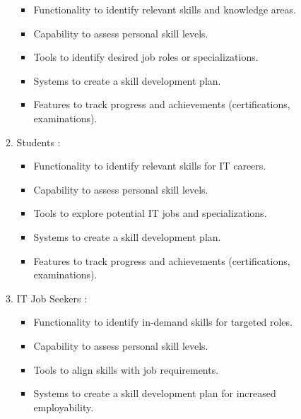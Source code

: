 \begin{enumerate}
\begin{enumerate}
\begin{itemize}
                        \renewcommand\labelitemi{-}
                        \item Functionality to identify relevant skills and knowledge areas.
                        \item Capability to assess personal skill levels.
                        \item Tools to identify desired job roles or specializations.
                        \item Systems to create a skill development plan.
                        \item Features to track progress and achievements (certifications, examinations).
                    \end{itemize}
              \item Students : \\
                    \begin{itemize}
                        \renewcommand\labelitemi{-}
                        \item Functionality to identify relevant skills for IT careers.
                        \item Capability to assess personal skill levels.
                        \item Tools to explore potential IT jobs and specializations.
                        \item Systems to create a skill development plan.
                        \item Features to track progress and achievements (certifications, examinations).
                    \end{itemize}
              \newpage      
              \item IT Job Seekers : \\
                    \begin{itemize}
                        \renewcommand\labelitemi{-}
                        \item Functionality to identify in-demand skills for targeted roles.
                        \item Capability to assess personal skill levels.
                        \item Tools to align skills with job requirements.
                        \item Systems to create a skill development plan for increased employability.
                    \end{itemize}
          \end{enumerate}

\end{enumerate}
